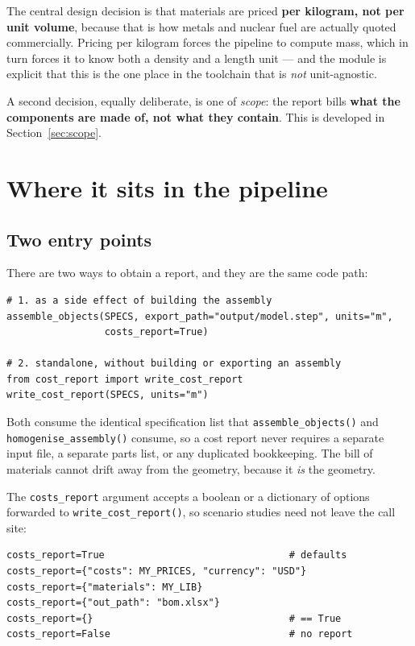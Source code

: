 \documentclass[9pt,a4paper]{extarticle}
\newcommand{\code}[1]{\texttt{\small #1}}
\begin{document}
The central design decision is that materials are priced \textbf{per kilogram,
not per unit volume}, because that is how metals and nuclear fuel are actually
quoted commercially. Pricing per kilogram forces the pipeline to compute mass,
which in turn forces it to know both a density and a length unit --- and the
module is explicit that this is the one place in the toolchain that is
\emph{not} unit-agnostic.

A second decision, equally deliberate, is one of \emph{scope}: the report bills
\textbf{what the components are made of, not what they contain}. This is
developed in Section~\ref{sec:scope}.

\section{Where it sits in the pipeline}

\subsection{Two entry points}

There are two ways to obtain a report, and they are the same code path:

\begin{lstlisting}[style=py]
# 1. as a side effect of building the assembly
assemble_objects(SPECS, export_path="output/model.step", units="m",
                 costs_report=True)

# 2. standalone, without building or exporting an assembly
from cost_report import write_cost_report
write_cost_report(SPECS, units="m")
\end{lstlisting}

Both consume the identical specification list that
\code{assemble\_objects()} and \code{homogenise\_assembly()} consume, so a cost
report never requires a separate input file, a separate parts list, or any
duplicated bookkeeping. The bill of materials cannot drift away from the
geometry, because it \emph{is} the geometry.

The \code{costs\_report} argument accepts a boolean or a dictionary of options
forwarded to \code{write\_cost\_report()}, so scenario studies need not leave the
call site:

\begin{lstlisting}[style=py]
costs_report=True                                # defaults
costs_report={"costs": MY_PRICES, "currency": "USD"}
costs_report={"materials": MY_LIB}
costs_report={"out_path": "bom.xlsx"}
costs_report={}                                  # == True
costs_report=False                               # no report
\end{lstlisting}
\end{document}

